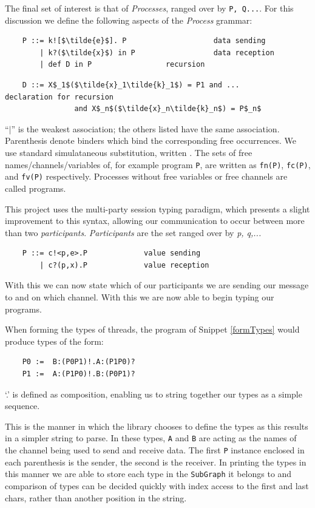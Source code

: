 \documentclass[11pt, abstracton, twoside, titlepage=true]{scrartcl}
\begin{document}
The final set of interest is that of \emph{Processes}, ranged over 
by \texttt{P, Q...}. For this discussion we define the following aspects 
of the \emph{Process} grammar:
\\
\begin{lstlisting}
    P ::= k![$\tilde{e}$]. P                    data sending
        | k?($\tilde{x}$) in P                  data reception
        | def D in P                 recursion
\end{lstlisting}
\begin{lstlisting}
    D ::= X$_1$($\tilde{x}_1\tilde{k}_1$) = P1 and ...           declaration for recursion
                and X$_n$($\tilde{x}_n\tilde{k}_n$) = P$_n$ 
\end{lstlisting}

``$|$'' is the weakest association; the others listed have the same association. 
Parenthesis denote binders which bind the corresponding free occurrences. We use 
standard simulataneous substitution, written $ $. The sets of free 
names/channels/variables of, for example program \texttt{P}, are written as 
\texttt{fn(P)}, \texttt{fc(P)}, and \texttt{fv(P)} respectively. Processes without 
free variables or free channels are called programs.

This project uses the multi-party session typing paradigm, which presents a slight
improvement to this syntax, allowing our communication to occur between more
than two \emph{participants}. \emph{Participants} are the set ranged over by 
\emph{p, q,...}
\\
\begin{lstlisting}
    P ::= c!<p,e>.P             value sending
        | c?(p,x).P             value reception
\end{lstlisting}

With this we can now state which of our participants we are sending our message
to and on which channel. With this we are now able to begin typing our programs.

When forming the types of threads, the program of Snippet \ref{formTypes}
would produce types of the form:
\\
\begin{lstlisting}
    P0 :=  B:(P0P1)!.A:(P1P0)?
    P1 :=  A:(P1P0)!.B:(P0P1)?
\end{lstlisting}

`.' is defined as composition, enabling us to string together our types as
a simple sequence.

This is the manner in which the library chooses to define the types as this
results in a simpler string to parse. In these types, \texttt{A} and \texttt{B} 
are acting as the names of the channel being used to send and receive data.
The first \texttt{P} instance enclosed in each parenthesis is the sender, the 
second is the receiver. In printing the types in this manner we are able to 
store each type in the \texttt{SubGraph} it belongs to and comparison of types
can be decided quickly with index access to the first and last chars, rather than
another position in the string.
\end{document}
